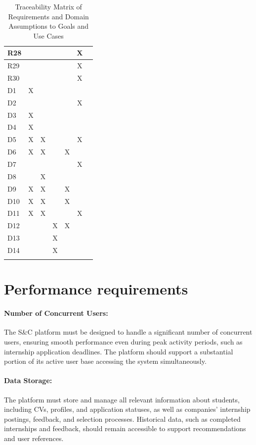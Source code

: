 \begin{longtable}{|l|c|c|c|c|c|l|}
\hline
R28 &   &   &   &   & X &       \\
\hline
R29 &   &   &   &   & X &       \\
\hline
R30 &   &   &   &   & X &       \\
\hline
D1  & X &   &   &   &   &       \\
\hline
D2  &   &   &   &   & X &       \\
\hline
D3  & X &   &   &   &   &       \\
\hline
D4  & X &   &   &   &   &       \\
\hline
D5  & X & X &   &   & X &       \\
\hline
D6  & X & X &   & X &   &       \\
\hline
D7  &   &   &   &   & X &       \\
\hline
D8  &   & X &   &   &   &       \\
\hline
D9  & X & X &   & X &   &       \\
\hline
D10 & X & X &   & X &   &       \\
\hline
D11 & X & X &   &   & X &       \\
\hline
D12 &   &   & X & X &   &       \\
\hline
D13 &   &   & X &   &   &       \\
\hline
D14 &   &   & X &   &   &       \\
\hline
\caption{Traceability Matrix of Requirements and Domain Assumptions to Goals and Use Cases}
\label{tab:mapping_requirements_domain_assumptions}
\end{longtable}


\section{Performance requirements}
\label{sec:performance_requirements}%


\paragraph{Number of Concurrent Users:}
  The S\&C platform must be designed to handle a significant number of
  concurrent users, ensuring smooth performance even during peak
  activity periods, such as internship application deadlines. The
  platform should support a substantial portion of its active user base
  accessing the system simultaneously.
\paragraph{Data Storage:}
  The platform must store and manage all relevant information about
  students, including CVs, profiles, and application statuses, as well
  as companies' internship postings, feedback, and selection processes.
  Historical data, such as completed internships and feedback, should
  remain accessible to support recommendations and user references.
